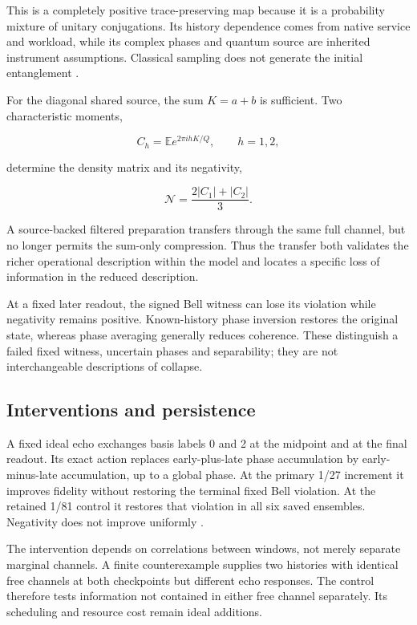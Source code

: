 \documentclass[11pt,a4paper]{article}
\begin{document}
This is a completely positive trace-preserving map because it is a probability mixture of unitary conjugations. Its history dependence comes from native service and workload, while its complex phases and quantum source are inherited instrument assumptions. Classical sampling does not generate the initial entanglement \cite{R32}.

For the diagonal shared source, the sum \(K=a+b\) is sufficient. Two characteristic moments,

\begin{equation}\label{eq:12}
C_h=\mathbb E e^{2\pi i hK/Q},\qquad h=1,2,
\end{equation}

determine the density matrix and its negativity,

\begin{equation}\label{eq:13}
\mathcal N=\frac{2|C_1|+|C_2|}{3}.
\end{equation}

A source-backed filtered preparation transfers through the same full channel, but no longer permits the sum-only compression. Thus the transfer both validates the richer operational description within the model and locates a specific loss of information in the reduced description.

At a fixed later readout, the signed Bell witness can lose its violation while negativity remains positive. Known-history phase inversion restores the original state, whereas phase averaging generally reduces coherence. These distinguish a failed fixed witness, uncertain phases and separability; they are not interchangeable descriptions of collapse.

\subsection{Interventions and persistence}\label{interventions-and-persistence}

A fixed ideal echo exchanges basis labels 0 and 2 at the midpoint and at the final readout. Its exact action replaces early-plus-late phase accumulation by early-minus-late accumulation, up to a global phase. At the primary 1/27 increment it improves fidelity without restoring the terminal fixed Bell violation. At the retained 1/81 control it restores that violation in all six saved ensembles. Negativity does not improve uniformly \cite{R33}.

The intervention depends on correlations between windows, not merely separate marginal channels. A finite counterexample supplies two histories with identical free channels at both checkpoints but different echo responses. The control therefore tests information not contained in either free channel separately. Its scheduling and resource cost remain ideal additions.
\end{document}
